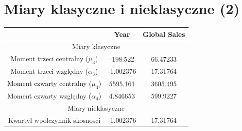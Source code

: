 \documentclass[12pt]{article}
\begin{document}
	\section{Miary klasyczne i nieklasyczne (2)}
	\begin{table}[h]
		\centering
		\begin{tabular}{|c|c|c|}
			\hline
			\multicolumn{1}{|l|}{}                              & Year                             & Global Sales                     \\ \hline
			\multicolumn{3}{|c|}{Miary klasyczne}                                                                                                           \\ \hline
			\multicolumn{1}{|c|}{Moment trzeci centralny (\(\mu_{3}\))}       & \multicolumn{1}{c|}{\cellcolor[HTML]{FFFFFF}-198.522}  & \cellcolor[HTML]{FFFFFF}66.47233 \\ \hline
			\multicolumn{1}{|c|}{Moment trzeci względny (\(\alpha_{3}\))}        & \multicolumn{1}{c|}{\cellcolor[HTML]{FFFFFF}-1.002376} & \cellcolor[HTML]{FFFFFF}17.31764 \\ \hline
			\multicolumn{1}{|c|}{Moment czwarty centralny (\(\mu_{4}\))}      & \multicolumn{1}{c|}{\cellcolor[HTML]{FFFFFF}5595.161}  & \cellcolor[HTML]{FFFFFF}3605.495 \\ \hline
			\multicolumn{1}{|c|}{Moment czwarty względny (\(\alpha_{4}\))}       & \multicolumn{1}{c|}{\cellcolor[HTML]{FFFFFF}4.846653}  & \cellcolor[HTML]{FFFFFF}599.9227 \\ \hline
			\multicolumn{3}{|c|}{Miary nieklasyczne}                                                                                                        \\ \hline
			\multicolumn{1}{|c|}{Kwartyl wpolczynnik skosnosci} & \multicolumn{1}{c|}{\cellcolor[HTML]{FFFFFF}-1.002376} & \cellcolor[HTML]{FFFFFF}17.31764 \\ \hline
		\end{tabular}
	\end{table}
\end{document}
